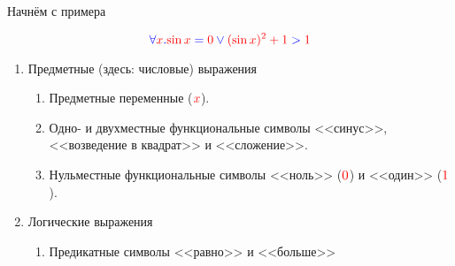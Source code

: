 \documentclass[aspectratio=169]{beamer}
\begin{document}
\begin{frame}{Начнём с примера}

$$\color{blue}\forall {\color{red}x}.{\color{red}\sin x} = {\color{red}0} \vee {\color{red}(\sin x)^2+1} > {\color{red}1}$$ \pause

\begin{enumerate}
\item Предметные (здесь: числовые) выражения
\begin{enumerate}
\item Предметные переменные ($\color{red}x$).\pause
\item Одно- и двухместные функциональные символы <<синус>>, <<возведение в квадрат>> и <<сложение>>.\pause%
\item Нульместные функциональные символы <<ноль>> ($\color{red}0$) и <<один>> ($\color{red}1$).\pause%
\end{enumerate}
\item Логические выражения
\begin{enumerate}\item Предикатные символы <<равно>> и <<больше>> %
\end{enumerate}
\end{enumerate}

\end{frame}
\end{document}
